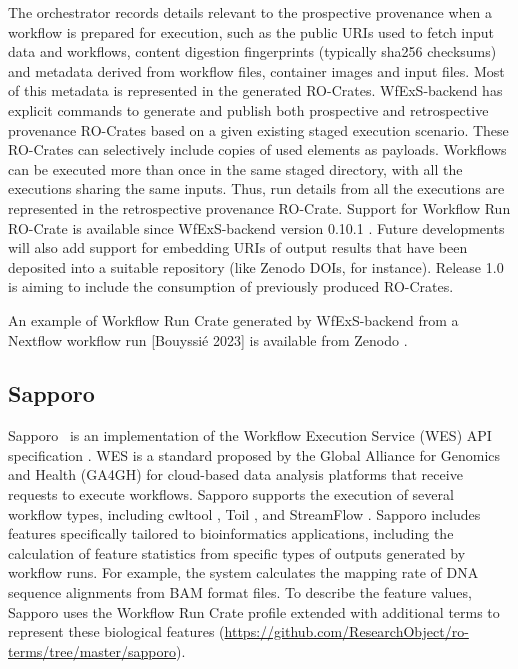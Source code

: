 \documentclass[10pt,letterpaper]{article}
\begin{document}
The orchestrator records details relevant to the prospective provenance when a workflow is prepared for execution, such as the public URIs used to fetch input data and workflows, content digestion fingerprints (typically sha256 checksums) and metadata derived from workflow files, container images and input files.
Most of this metadata is represented in the generated RO-Crates. WfExS-backend has explicit commands to generate and publish both prospective and retrospective provenance RO-Crates based on a given existing staged execution scenario.
These RO-Crates can selectively include copies of used elements as payloads.
Workflows can be executed more than once in the same staged directory, with all the executions sharing the same inputs.
Thus, run details from all the executions are represented in the retrospective provenance RO-Crate. Support for Workflow Run RO-Crate is available since WfExS-backend version 0.10.1 \cite{Fernández 2023a}.
Future developments will also add support for embedding URIs of output results that have been deposited into a suitable repository (like Zenodo DOIs, for instance).
Release 1.0 is aiming to include the consumption of previously produced RO-Crates.

An example of Workflow Run Crate generated by WfExS-backend from a Nextflow workflow run [Bouyssié 2023] is available from Zenodo \cite{Fernández 2023b}.


\subsection{Sapporo}\label{sapporo}

Sapporo~\cite{Suetake 2022a} is an implementation of the Workflow Execution Service (WES) API specification \cite{Magee 2018}.
WES is a standard proposed by the Global Alliance for Genomics and Health (GA4GH) for cloud-based data analysis platforms that receive requests to execute workflows.
Sapporo supports the execution of several workflow types, including cwltool \cite{Amstutz 2023}, Toil \cite{Vivian 2017}, and StreamFlow \cite{Colonnelli 2020}.
Sapporo includes features specifically tailored to bioinformatics applications, including the calculation of feature statistics from specific types of outputs generated by workflow runs.
For example, the system calculates the mapping rate of DNA sequence alignments from BAM format files.
To describe the feature values, Sapporo uses the Workflow Run Crate profile extended with additional terms to represent these biological features (\url{https://github.com/ResearchObject/ro-terms/tree/master/sapporo}).
\end{document}
